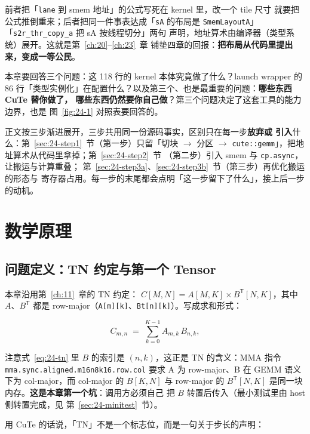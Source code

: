 前者把「\texttt{lane} 到 smem 地址」的公式写死在 kernel 里，改一个 tile 尺寸
就要把公式推倒重来；后者把同一件事表达成「\texttt{sA} 的布局是
\texttt{SmemLayoutA}」「\texttt{s2r\_\allowbreak{}thr\_\allowbreak{}copy\_\allowbreak{}a} 把 sA 按线程切分」两句
声明，地址算术由编译器（类型系统）展开。这就是第~\ref{ch:20}--\ref{ch:23}~章
铺垫四章的回报：\textbf{把布局从代码里提出来，变成一等公民}。

本章要回答三个问题：这 118 行的 kernel 本体究竟做了什么？launch wrapper 的 86
行「类型实例化」在配置什么？以及第三个、也是最重要的问题：\textbf{哪些东西 CuTe 替你做了，
哪些东西仍然要你自己做}？第三个问题决定了这套工具的能力边界，也是
图~\ref{fig:24-1} 对照表要回答的。

正文按三步渐进展开，三步共用同一份源码事实，区别只在每一步\textbf{放弃或
引入}什么：第~\ref{sec:24-step1}~节（第一步）只留「切块 $\to$ 分区 $\to$
\texttt{cute::gemm}」，把地址算术从代码里拿掉；第~\ref{sec:24-step2}~节
（第二步）引入 smem 与 \texttt{cp.async}，让搬运与计算重叠；
第~\ref{sec:24-step3a}、\ref{sec:24-step3b}~节（第三步）再优化搬运的形态与
寄存器占用。每一步的末尾都会点明「这一步留下了什么」，接上后一步的动机。

\section{数学原理}

\subsection{问题定义：TN 约定与第一个 Tensor}

本章沿用第~\ref{ch:11}~章的 TN 约定：
$C[M,N] = A[M,K]\times B^{\mathsf T}[N,K]$，其中 $A$、$B^{\mathsf T}$ 都是
row-major（\texttt{A[m][k]}、\texttt{Bt[n][k]}）。写成求和形式：

\begin{equation}
  C_{m,n} \;=\; \sum_{k=0}^{K-1} A_{m,k}\, B_{n,k},
  \label{eq:24-tn}
\end{equation}

注意式~\eqref{eq:24-tn} 里 $B$ 的索引是 $(n,k)$，这正是 TN 的含义：MMA 指令
\texttt{mma.\allowbreak{}sync.\allowbreak{}aligned.\allowbreak{}m16n8k16.row.\allowbreak{}col} 要求 A 为 row-major、B 在 GEMM
语义下为 col-major，而 col-major 的 $B[K,N]$ 与 row-major 的
$B^{\mathsf T}[N,K]$ 是同一块内存。\textbf{这是本章第一个坑}：调用方必须自己
把 $B$ 转置后传入（最小测试里由 host 侧转置完成，见
第~\ref{sec:24-minitest}~节）。

用 CuTe 的话说，「TN」不是一个标志位，而是一句关于步长的声明：

